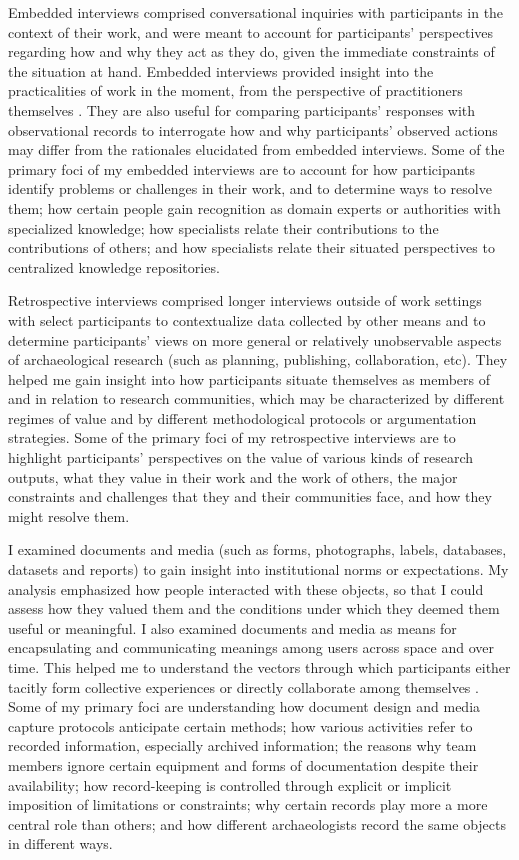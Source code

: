 Embedded interviews comprised conversational inquiries with participants in the context of their work, and were meant to account for participants' perspectives regarding how and why they act as they do, given the immediate constraints of the situation at hand.
Embedded interviews provided insight into the practicalities of work in the moment, from the perspective of practitioners themselves \parencites[]{flick1997}[]{flick2000}[]{witzel2000}.
They are also useful for comparing participants' responses with observational records to interrogate how and why participants' observed actions may differ from the rationales elucidated from embedded interviews.
Some of the primary foci of my embedded interviews are to account for how participants identify problems or challenges in their work, and to determine ways to resolve them; how certain people gain recognition as domain experts or authorities with specialized knowledge; how specialists relate their contributions to the contributions of others; and how specialists relate their situated perspectives to centralized knowledge repositories.

Retrospective interviews comprised longer interviews outside of work settings with select participants to contextualize data collected by other means and to determine participants' views on more general or relatively unobservable aspects of archaeological research (such as planning, publishing, collaboration, etc).
They helped me gain insight into how participants situate themselves as members of and in relation to research communities, which may be characterized by different regimes of value and by different methodological protocols or argumentation strategies.
Some of the primary foci of my retrospective interviews are to highlight participants' perspectives on the value of various kinds of research outputs, what they value in their work and the work of others, the major constraints and challenges that they and their communities face, and how they might resolve them.

I examined documents and media (such as forms, photographs, labels, databases, datasets and reports) to gain insight into institutional norms or expectations.
My analysis emphasized how people interacted with these objects, so that I could assess how they valued them and the conditions under which they deemed them useful or meaningful.
I also examined documents and media as means for encapsulating and communicating meanings among users across space and over time.
This helped me to understand the vectors through which participants either tacitly form collective experiences or directly collaborate among themselves \parencites[]{huvila2011}[]{huvila2016}[]{yarrow2008}.
Some of my primary foci are understanding how document design and media capture protocols anticipate certain methods; how various activities refer to recorded information, especially archived information; the reasons why team members ignore certain equipment and forms of documentation despite their availability; how record-keeping is controlled through explicit or implicit imposition of limitations or constraints; why certain records play more a more central role than others; and how different archaeologists record the same objects in different ways.

